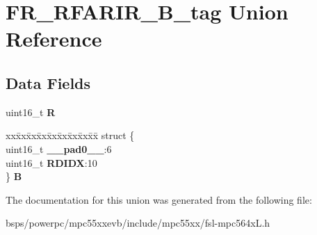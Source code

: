 \hypertarget{unionFR__RFARIR__16B__tag}{}\section{F\+R\+\_\+\+R\+F\+A\+R\+I\+R\+\_\+B\+\_\+tag Union Reference}
\label{unionFR__RFARIR__16B__tag}
\subsection*{Data Fields}
\begin{DoxyCompactItemize}
\item 
\mbox{\label{unionFR__RFARIR__16B__tag_a9ade42b7682eb97c53f774e4d9ed540c}} 
uint16\+\_\+t {\bfseries R}
\item 
\mbox{\label{unionFR__RFARIR__16B__tag_adf96aa39f93af76e8aca23c0356a0250}} 
\begin{tabbing}
xx\=xx\=xx\=xx\=xx\=xx\=xx\=xx\=xx\=\kill
struct \{\\
\>uint16\_t {\bfseries \_\_pad0\_\_}:6\\
\>uint16\_t {\bfseries RDIDX}:10\\
\} {\bfseries B}\\

\end{tabbing}\end{DoxyCompactItemize}


The documentation for this union was generated from the following file\+:\begin{DoxyCompactItemize}
\item 
bsps/powerpc/mpc55xxevb/include/mpc55xx/fsl-\/mpc564x\+L.\+h\end{DoxyCompactItemize}
